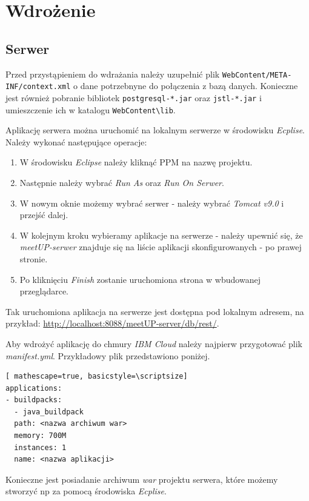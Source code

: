 \documentclass[12pt]{article}
\begin{document}
\pagebreak
\section{Wdrożenie}

\subsection{Serwer}
Przed przystąpieniem do wdrażania należy uzupełnić plik \verb+WebContent/META-+  \verb+INF/context.xml+ o dane potrzebnyne do połączenia z bazą danych. Konieczne jest również pobranie bibliotek \verb+postgresql-*.jar+ oraz  \verb+jstl-*.jar+ i umieszczenie ich w katalogu \verb+WebContent\lib+.

\vspace{0.5cm}

Aplikację serwera można uruchomić na lokalnym serwerze w środowisku \textit{Ecplise}. Należy wykonać następujące operacje:
\begin{enumerate}
\item W środowisku \textit{Eclipse} należy kliknąć PPM na nazwę projektu.
\item Następnie należy wybrać \textit{Run As} oraz \textit{Run On Serwer}.
\item W nowym oknie możemy wybrać serwer - należy wybrać \textit{Tomcat v9.0} i przejść dalej.
\item W kolejnym kroku wybieramy aplikacje na serwerze - należy upewnić się, że \textit{meetUP-serwer} znajduje się na liście aplikacji skonfigurowanych - po prawej stronie.
\item Po kliknięciu \textit{Finish} zostanie uruchomiona strona w wbudowanej przeglądarce.
\end{enumerate}

Tak uruchomiona aplikacja na serwerze jest dostępna pod lokalnym adresem, na przykład: \url{http://localhost:8088/meetUP-server/db/rest/}.

\vspace{0.5cm}

Aby wdrożyć aplikację do chmury \textit{IBM Cloud} należy najpierw przygotować plik \textit{manifest.yml}. Przykładowy plik przedstawiono poniżej.
\begin{lstlisting}[ mathescape=true, basicstyle=\scriptsize]
applications:
- buildpacks: 
  - java_buildpack
  path: <nazwa archiwum war>
  memory: 700M
  instances: 1
  name: <nazwa aplikacji>
\end{lstlisting}

Konieczne jest posiadanie archiwum \textit{war} projektu serwera, które możemy stworzyć np za pomocą środowiska \textit{Ecplise}. 
\end{document}
